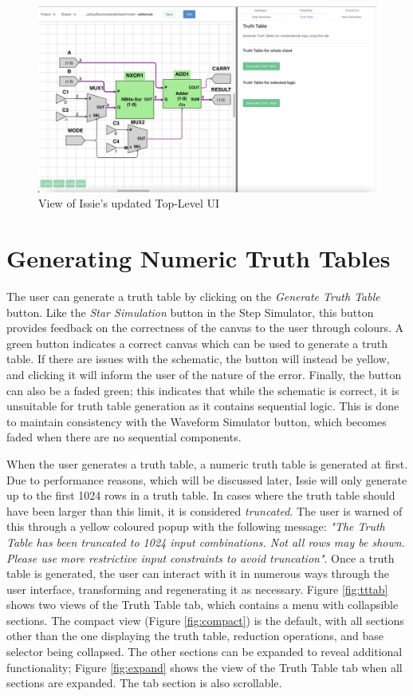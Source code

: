 \begin{figure}[h]
    \centering
    \includegraphics[width=\textwidth]{04.AnalysisDesign/Issieview.png}
    \caption{View of Issie's updated Top-Level UI}
    \label{fig:issieview}
\end{figure}

\section{Generating Numeric Truth Tables} \label{sec:analysis_ttGen}
The user can generate a truth table by clicking on the \textit{Generate Truth Table} button. Like the  \textit{Star Simulation} button in the Step Simulator, this button provides feedback on the correctness of the canvas to the user through colours. A green button indicates a correct canvas which can be used to generate a truth table. If there are issues with the schematic, the button will instead be yellow, and clicking it will inform the user of the nature of the error. Finally, the button can also be a faded green; this indicates that while the schematic is correct, it is unsuitable for truth table generation as it contains sequential logic. This is done to maintain consistency with the Waveform Simulator button, which becomes faded when there are no sequential components.

When the user generates a truth table, a numeric truth table is generated at first. Due to performance reasons, which will be discussed later, Issie will only generate up to the first 1024 rows in a truth table. In cases where the truth table should have been larger than this limit, it is considered \textit{truncated}. The user is warned of this through a yellow coloured popup with the following message: \textit{"The Truth Table has been truncated to 1024 input combinations. Not all rows may be shown. Please use more restrictive input constraints to avoid truncation"}. Once a truth table is generated, the user can interact with it in numerous ways through the user interface, transforming and regenerating it as necessary. Figure \ref{fig:tttab} shows two views of the Truth Table tab, which contains a menu with collapsible sections. The compact view (Figure \ref{fig:compact}) is the default, with all sections other than the one displaying the truth table, reduction operations, and base selector being collapsed. The other sections can be expanded to reveal additional functionality; Figure \ref{fig:expand} shows the view of the Truth Table tab when all sections are expanded. The tab section is also scrollable.


